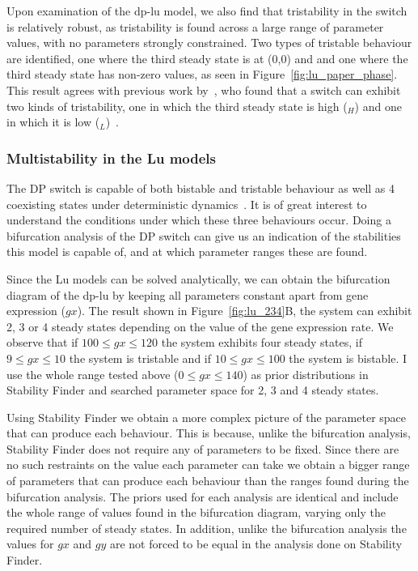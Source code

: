 Upon examination of the \acrshort{dp-lu} model, we also find that tristability in the switch is relatively robust, as tristability is found across a large range of parameter values, with no parameters strongly constrained. Two types of tristable behaviour are identified, one where the third steady state is at (0,0) and and one where the third steady state has non-zero values, as seen in Figure~\ref{fig:lu_paper_phase}. This result agrees with previous work by~\textcite{Guantes:2008gs}, who found that a switch can exhibit two kinds of tristability, one in which the third steady state is high ($_H$) and one in which it is low ($_L$)~\autocite{Guantes:2008gs}. %

\subsubsection{Multistability in the Lu models}
\label{sec:lu_234}
The DP switch is capable of both bistable and tristable behaviour as well as 4 coexisting states under deterministic dynamics~\autocite{Guantes:2008gs}. It is of great interest to understand the conditions under which these three behaviours occur. Doing a bifurcation analysis of the DP switch can give us an indication of the stabilities this model is capable of, and at which parameter ranges these are found.  

Since the Lu models can be solved analytically, we can obtain the bifurcation diagram of the \acrshort{dp-lu} by keeping all parameters constant apart from gene expression ($gx$). The result shown in Figure~\ref{fig:lu_234}B, the system can exhibit 2, 3 or 4 steady states depending on the value of the gene expression rate. We observe that if $100 \leq gx\leq 120$ the system exhibits four steady states, if $9 \leq gx\leq 10$ the system is tristable and if $10 \leq gx\leq 100$ the system is bistable. I use the whole range tested above ($0 \leq gx\leq 140$) as prior distributions in Stability Finder and searched parameter space for 2, 3 and 4 steady states.

 Using Stability Finder we obtain a more complex picture of the parameter space that can produce each behaviour. This is because, unlike the bifurcation analysis, Stability Finder does not require any of parameters to be fixed. Since there are no such restraints on the value each parameter can take we obtain a bigger range of parameters that can produce each behaviour than the ranges found during the bifurcation analysis. The priors used for each analysis are identical and include the whole range of values found in the bifurcation diagram, varying only the required number of steady states. In addition, unlike the bifurcation analysis the values for $gx$ and $gy$ are not forced to be equal in the analysis done on Stability Finder.

